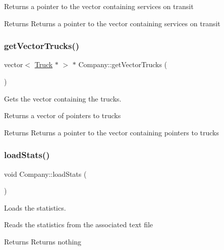 Returns a pointer to the vector containing services on transit

\begin{DoxyReturn}{Returns}
Returns a pointer to the vector containing services on transit 
\end{DoxyReturn}
\mbox{\label{class_company_a78feb735977ce59f253a30082dbf24b6}} 
\subsubsection{\texorpdfstring{get\+Vector\+Trucks()}{getVectorTrucks()}}
{\footnotesize\ttfamily vector$<$ \hyperlink{class_truck}{Truck} $\ast$ $>$ $\ast$ Company\+::get\+Vector\+Trucks (\begin{DoxyParamCaption}{ }\end{DoxyParamCaption})}



Gets the vector containing the trucks. 

Returns a vector of pointers to trucks

\begin{DoxyReturn}{Returns}
Returns a pointer to the vector containing pointers to trucks 
\end{DoxyReturn}
\mbox{\label{class_company_a1e471fb69b7924e03cfdc01c3692f26c}} 
\subsubsection{\texorpdfstring{load\+Stats()}{loadStats()}}
{\footnotesize\ttfamily void Company\+::load\+Stats (\begin{DoxyParamCaption}{ }\end{DoxyParamCaption})}



Loads the statistics. 

Reads the statistics from the associated text file

\begin{DoxyReturn}{Returns}
Returns nothing 
\end{DoxyReturn}
\mbox{\label{class_company_aa5b12f509c71984f7346b14cff38ea50}} 
